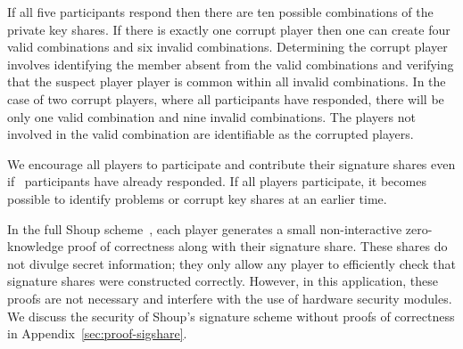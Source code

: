 If all five participants respond then there are ten possible
combinations of the private key shares. If there is exactly one corrupt
player then one can create four valid combinations and six invalid
combinations. Determining the corrupt player involves identifying the
member absent from the valid combinations and verifying that the
suspect player player is common within all invalid combinations.  In
the case of two corrupt players, where all participants have
responded, there will be only one valid combination and nine invalid
combinations. The players not involved in the valid combination are
identifiable as the corrupted players.

We encourage all players to participate and
contribute their signature shares even if \nums\ participants have
already responded. If all players participate, it becomes possible to
identify problems or corrupt key shares at an earlier time.

In the full Shoup scheme~\cite{shoup-sig}, each player generates a small non-interactive zero-knowledge proof of
correctness along with their signature share. These shares do not
divulge secret information; they only allow any player to efficiently
check that signature shares were constructed correctly. However, in this application, these proofs are not necessary and interfere with the use of hardware security modules. We discuss the
security of Shoup's signature scheme without proofs of correctness in
Appendix~\ref{sec:proof-sigshare}.



